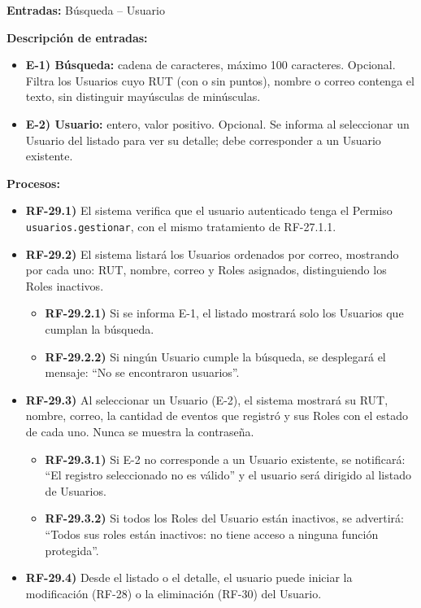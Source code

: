 \textbf{Entradas:} B\'usqueda -- Usuario

\textbf{Descripci\'on de entradas:}
\begin{itemize}[label={}, leftmargin=1.5em]
  \item \textbf{E-1) B\'usqueda:} cadena de caracteres, m\'aximo 100 caracteres. Opcional. Filtra los Usuarios cuyo RUT (con o sin puntos), nombre o correo contenga el texto, sin distinguir may\'usculas de min\'usculas.
  \item \textbf{E-2) Usuario:} entero, valor positivo. Opcional. Se informa al seleccionar un Usuario del listado para ver su detalle; debe corresponder a un Usuario existente.
\end{itemize}

\textbf{Procesos:}
\begin{itemize}[label={}, leftmargin=1.5em]
  \item \textbf{RF-29.1)} El sistema verifica que el usuario autenticado tenga el Permiso \texttt{usuarios.gestionar}, con el mismo tratamiento de RF-27.1.1.
  \item \textbf{RF-29.2)} El sistema listar\'a los Usuarios ordenados por correo, mostrando por cada uno: RUT, nombre, correo y Roles asignados, distinguiendo los Roles inactivos.
  \begin{itemize}[label={}, leftmargin=1.5em]
    \item \textbf{RF-29.2.1)} Si se informa E-1, el listado mostrar\'a solo los Usuarios que cumplan la b\'usqueda.
    \item \textbf{RF-29.2.2)} Si ning\'un Usuario cumple la b\'usqueda, se desplegar\'a el mensaje: ``No se encontraron usuarios''.
  \end{itemize}
  \item \textbf{RF-29.3)} Al seleccionar un Usuario (E-2), el sistema mostrar\'a su RUT, nombre, correo, la cantidad de eventos que registr\'o y sus Roles con el estado de cada uno. Nunca se muestra la contrase\~na.
  \begin{itemize}[label={}, leftmargin=1.5em]
    \item \textbf{RF-29.3.1)} Si E-2 no corresponde a un Usuario existente, se notificar\'a: ``El registro seleccionado no es v\'alido'' y el usuario ser\'a dirigido al listado de Usuarios.
    \item \textbf{RF-29.3.2)} Si todos los Roles del Usuario est\'an inactivos, se advertir\'a: ``Todos sus roles est\'an inactivos: no tiene acceso a ninguna funci\'on protegida''.
  \end{itemize}
  \item \textbf{RF-29.4)} Desde el listado o el detalle, el usuario puede iniciar la modificaci\'on (RF-28) o la eliminaci\'on (RF-30) del Usuario.
\end{itemize}

